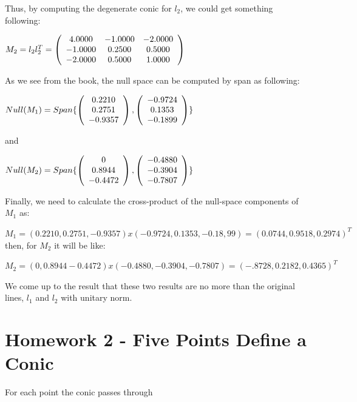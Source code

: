 \documentclass[]{article}
\begin{document}
Thus, by computing the degenerate conic for $l_{2}$, we could get something following:

\centerline {
$M_{2} = l_{2}l_{2}^T = 
\left( {\begin{array}{*{20}c}
	4.0000 & -1.0000 & -2.0000 \\
	-1.0000 & 0.2500 & 0.5000 \\
	-2.0000 &  0.5000 & 1.0000   
	\end{array} } \right)$
}

As we see from the book, the null space can be computed by span as following:

\centerline {
	$Null(M_{1}) = Span\{\left( {\begin{array}{*{20}c}
	0.2210 \\
	0.2751 \\
	-0.9357  
	\end{array} } \right),\left( {\begin{array}{*{20}c}
	-0.9724 \\
	 0.1353 \\
	-0.1899  
	\end{array} } \right) \}$ 
}

and 

\centerline { $Null(M_{2}) = Span\{\left( {\begin{array}{*{20}c}
	0 \\
	0.8944 \\
	-0.4472  
	\end{array} } \right),\left( {\begin{array}{*{20}c}
	-0.4880 \\
	-0.3904 \\
	-0.7807  
	\end{array} } \right) \}$ }

Finally, we need to calculate the cross-product of the null-space components of $M_{1}$ as:

$M_{1} = (0.2210, 0.2751, -0.9357)x(-0.9724, 0.1353, -0.18,99) = (0.0744, 0.9518, 0.2974)^T$
\vspace{0.2em}
then, for $M_{2}$ it will be like:
\vspace{0.2em}

$M_{2} = (0, 0.8944 - 0.4472) x (-0.4880, -0.3904, -0.7807) = (-.8728, 0.2182, 0.4365)^T$

We come up to the result that these two results are no more than the original lines, $l_{1}$ and $l_{2}$ with unitary norm.  

\section{Homework 2 - Five Points Define a Conic}
For each point the conic passes through 
\end{document}
